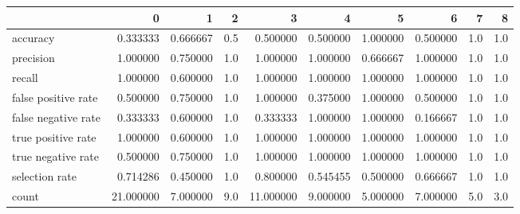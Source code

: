\begin{tabular}{lrrrrrrrrr}
\toprule
{} &          0 &         1 &    2 &          3 &         4 &         5 &         6 &    7 &    8 \\
\midrule
accuracy            &   0.333333 &  0.666667 &  0.5 &   0.500000 &  0.500000 &  1.000000 &  0.500000 &  1.0 &  1.0 \\
precision           &   1.000000 &  0.750000 &  1.0 &   1.000000 &  1.000000 &  0.666667 &  1.000000 &  1.0 &  1.0 \\
recall              &   1.000000 &  0.600000 &  1.0 &   1.000000 &  1.000000 &  1.000000 &  1.000000 &  1.0 &  1.0 \\
false positive rate &   0.500000 &  0.750000 &  1.0 &   1.000000 &  0.375000 &  1.000000 &  0.500000 &  1.0 &  1.0 \\
false negative rate &   0.333333 &  0.600000 &  1.0 &   0.333333 &  1.000000 &  1.000000 &  0.166667 &  1.0 &  1.0 \\
true positive rate  &   1.000000 &  0.600000 &  1.0 &   1.000000 &  1.000000 &  1.000000 &  1.000000 &  1.0 &  1.0 \\
true negative rate  &   0.500000 &  0.750000 &  1.0 &   1.000000 &  1.000000 &  1.000000 &  1.000000 &  1.0 &  1.0 \\
selection rate      &   0.714286 &  0.450000 &  1.0 &   0.800000 &  0.545455 &  0.500000 &  0.666667 &  1.0 &  1.0 \\
count               &  21.000000 &  7.000000 &  9.0 &  11.000000 &  9.000000 &  5.000000 &  7.000000 &  5.0 &  3.0 \\
\bottomrule
\end{tabular}
